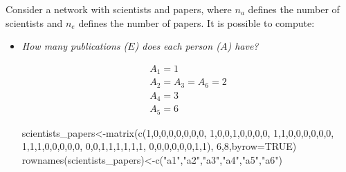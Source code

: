 \documentclass[
  notitlepage,
  onecolumn,
  openany]{book}
\newenvironment{Shaded}{\begin{snugshade}}{\end{snugshade}}
\newcommand{\AttributeTok}[1]{\textcolor[rgb]{0.77,0.63,0.00}{#1}}
\newcommand{\ConstantTok}[1]{\textcolor[rgb]{0.00,0.00,0.00}{#1}}
\newcommand{\DecValTok}[1]{\textcolor[rgb]{0.00,0.00,0.81}{#1}}
\newcommand{\FunctionTok}[1]{\textcolor[rgb]{0.00,0.00,0.00}{#1}}
\newcommand{\NormalTok}[1]{#1}
\newcommand{\OtherTok}[1]{\textcolor[rgb]{0.56,0.35,0.01}{#1}}
\newcommand{\StringTok}[1]{\textcolor[rgb]{0.31,0.60,0.02}{#1}}
\begin{document}
Consider a network with scientists and papers, where \(n_a\) defines the number of scientists and \(n_e\) defines the number of papers. It is possible to compute:

\begin{itemize}
\item
  \emph{How many publications (\(E\)) does each person (\(A\)) have?}

  \[
    \begin{aligned}
    A_1 = 1 \\
    A_2 = A_3 = A_6 = 2 \\
    A_4 = 3 \\
    A_5 = 6
    \end{aligned}
    \]

\begin{Shaded}
\begin{Highlighting}[]
\NormalTok{scientists\_papers}\OtherTok{\textless{}{-}}\FunctionTok{matrix}\NormalTok{(}\FunctionTok{c}\NormalTok{(}\DecValTok{1}\NormalTok{,}\DecValTok{0}\NormalTok{,}\DecValTok{0}\NormalTok{,}\DecValTok{0}\NormalTok{,}\DecValTok{0}\NormalTok{,}\DecValTok{0}\NormalTok{,}\DecValTok{0}\NormalTok{,}\DecValTok{0}\NormalTok{,}
                            \DecValTok{1}\NormalTok{,}\DecValTok{0}\NormalTok{,}\DecValTok{0}\NormalTok{,}\DecValTok{1}\NormalTok{,}\DecValTok{0}\NormalTok{,}\DecValTok{0}\NormalTok{,}\DecValTok{0}\NormalTok{,}\DecValTok{0}\NormalTok{,}
                            \DecValTok{1}\NormalTok{,}\DecValTok{1}\NormalTok{,}\DecValTok{0}\NormalTok{,}\DecValTok{0}\NormalTok{,}\DecValTok{0}\NormalTok{,}\DecValTok{0}\NormalTok{,}\DecValTok{0}\NormalTok{,}\DecValTok{0}\NormalTok{,}
                            \DecValTok{1}\NormalTok{,}\DecValTok{1}\NormalTok{,}\DecValTok{1}\NormalTok{,}\DecValTok{0}\NormalTok{,}\DecValTok{0}\NormalTok{,}\DecValTok{0}\NormalTok{,}\DecValTok{0}\NormalTok{,}\DecValTok{0}\NormalTok{,}
                            \DecValTok{0}\NormalTok{,}\DecValTok{0}\NormalTok{,}\DecValTok{1}\NormalTok{,}\DecValTok{1}\NormalTok{,}\DecValTok{1}\NormalTok{,}\DecValTok{1}\NormalTok{,}\DecValTok{1}\NormalTok{,}\DecValTok{1}\NormalTok{,}
                            \DecValTok{0}\NormalTok{,}\DecValTok{0}\NormalTok{,}\DecValTok{0}\NormalTok{,}\DecValTok{0}\NormalTok{,}\DecValTok{0}\NormalTok{,}\DecValTok{0}\NormalTok{,}\DecValTok{1}\NormalTok{,}\DecValTok{1}\NormalTok{),}
                            \DecValTok{6}\NormalTok{,}\DecValTok{8}\NormalTok{,}\AttributeTok{byrow=}\ConstantTok{TRUE}\NormalTok{)}
\FunctionTok{rownames}\NormalTok{(scientists\_papers)}\OtherTok{\textless{}{-}}\FunctionTok{c}\NormalTok{(}\StringTok{"a1"}\NormalTok{,}\StringTok{"a2"}\NormalTok{,}\StringTok{"a3"}\NormalTok{,}\StringTok{"a4"}\NormalTok{,}\StringTok{"a5"}\NormalTok{,}\StringTok{"a6"}\NormalTok{)}

\end{Highlighting}
\end{Shaded}
\end{itemize}
\end{document}
